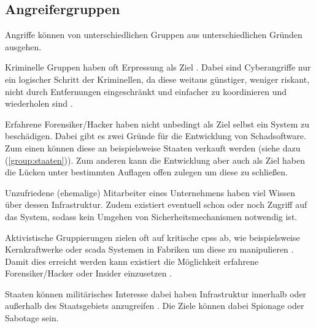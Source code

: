 \documentclass[final,bibliography=totocnumbered]{include/sikseminar}
\begin{document}

\subsection{Angreifergruppen}\label{subsec:angreifergruppen}

Angriffe können von unterschiedlichen Gruppen aus unterschiedlichen Gründen ausgehen.

\begin{compactenum}[(a)]
    \item Kriminelle Gruppen haben oft Erpressung als Ziel \cite{CAS+09,WYX+10}.
    Dabei sind Cyberangriffe nur ein logischer Schritt der Kriminellen, da diese weitaus günstiger, weniger riskant, nicht durch Entfernungen eingeschränkt und einfacher zu koordinieren und wiederholen sind \cite{CAS+09}.
    \item Erfahrene Forensiker/Hacker haben nicht unbedingt als Ziel selbst ein System zu beschädigen.
    Dabei gibt es zwei Gründe für die Entwicklung von Schadsoftware.
    Zum einen können diese an beispielsweise Staaten verkauft werden (siehe dazu (\ref{group:staaten})). 
    Zum anderen kann die Entwicklung aber auch als Ziel haben die Lücken unter bestimmten Auflagen offen zulegen um diese zu schließen. 
    \item Unzufriedene (ehemalige) Mitarbeiter eines Unternehmens haben viel Wissen über dessen Infrastruktur.
    Zudem existiert eventuell schon oder noch Zugriff auf das System, sodass kein Umgehen von Sicherheitsmechanismen notwendig ist. \cite{CAS+09,WYX+10}
    \item Aktivistische Gruppierungen zielen oft auf kritische \glspl{cps} ab, wie beispielsweise Kernkraftwerke oder \gls{scada} Systemen in Fabriken um diese zu manipulieren \cite{CAS+09,WYX+10}. 
    Damit dies erreicht werden kann existiert die Möglichkeit erfahrene Forensiker/Hacker oder Insider einzusetzen \cite{WYX+10}.
    \item Staaten können militärisches Interesse dabei haben Infrastruktur innerhalb oder außerhalb des Staatsgebiets anzugreifen \cite{CAS+09}.
    Die Ziele können dabei Spionage oder Sabotage sein.
    \label{group:staaten}
\end{compactenum}
\end{document}
